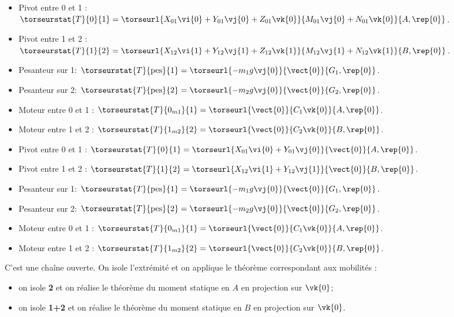 \ifprof
\begin{itemize}
\item Pivot entre 0 et 1 : $\torseurstat{T}{0}{1}=\torseurl{X_{01}\vi{0}+Y_{01}\vj{0}+Z_{01}\vk{0}}{M_{01}\vj{0}+N_{01}\vk{0}}{A,\rep{0}}$.
\item Pivot entre 1 et 2 : $\torseurstat{T}{1}{2}=\torseurl{X_{12}\vi{1}+Y_{12}\vj{1}+Z_{12}\vk{1}}{M_{12}\vj{1}+N_{12}\vk{1}}{B,\rep{0}}$.
\item Pesanteur sur 1: $\torseurstat{T}{\text{pes}}{1}=\torseurl{-m_1g\vj{0}}{\vect{0}}{G_1,\rep{0}}$.
\item Pesanteur sur 2: $\torseurstat{T}{\text{pes}}{2}=\torseurl{-m_2g\vj{0}}{\vect{0}}{G_2,\rep{0}}$.
\item Moteur entre 0 et 1 : $\torseurstat{T}{0_{m1}}{1}=\torseurl{\vect{0}}{C_1\vk{0}}{A,\rep{0}}$.
\item Moteur entre 1 et 2 : $\torseurstat{T}{1_{m2}}{2}=\torseurl{\vect{0}}{C_2\vk{0}}{B,\rep{0}}$.
\end{itemize}
\else
\fi

\ifprof
\begin{itemize}
\item Pivot entre 0 et 1 : $\torseurstat{T}{0}{1}=\torseurl{X_{01}\vi{0}+Y_{01}\vj{0}}{\vect{0}}{A,\rep{0}}$.
\item Pivot entre 1 et 2 : $\torseurstat{T}{1}{2}=\torseurl{X_{12}\vi{1}+Y_{12}\vj{1}}{\vect{0}}{B,\rep{0}}$.
\item Pesanteur sur 1: $\torseurstat{T}{\text{pes}}{1}=\torseurl{-m_1g\vj{0}}{\vect{0}}{G_1,\rep{0}}$.
\item Pesanteur sur 2: $\torseurstat{T}{\text{pes}}{2}=\torseurl{-m_2g\vj{0}}{\vect{0}}{G_2,\rep{0}}$.
\item Moteur entre 0 et 1 : $\torseurstat{T}{0_{m1}}{1}=\torseurl{\vect{0}}{C_1\vk{0}}{A,\rep{0}}$.
\item Moteur entre 1 et 2 : $\torseurstat{T}{1_{m2}}{2}=\torseurl{\vect{0}}{C_2\vk{0}}{B,\rep{0}}$.
\end{itemize}
\else
\fi

\ifprof
C'est une chaîne ouverte. On isole l'extrémité et on applique le théorème correspondant aux mobilités : 
\begin{itemize}
\item on isole \textbf{2} et on réalise le théorème du moment statique en $A$ en projection sur $\vk{0}$;
\item on isole \textbf{1+2} et on réalise le théorème du moment statique en $B$ en projection sur $\vk{0}$.
\end{itemize}
\else
\fi



\ifprof
\else


\fi
